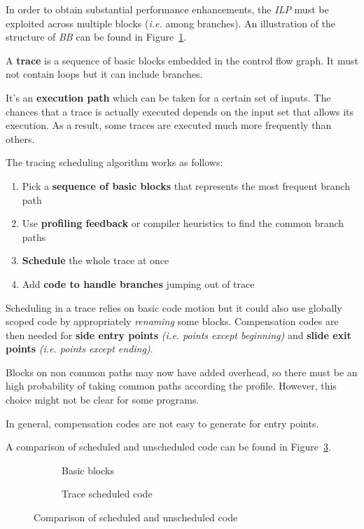 \documentclass[english]{article}
\begin{document}
In order to obtain substantial performance enhancements, the \textit{ILP} must be exploited across multiple blocks (\textit{i.e.} among branches).
An illustration of the structure of \textit{BB} can be found in Figure~\ref{fig:basic-blocks}.

\bigskip
A \textbf{trace} is a sequence of basic blocks embedded in the control flow graph.
It must not contain loops but it can include branches.

It's an \textbf{execution path} which can be taken for a certain set of inputs.
The chances that a trace is actually executed depends on the input set that allows its execution.
As a result, some traces are executed much more frequently than others.

The tracing scheduling algorithm works as follows:

\begin{enumerate}
  \item Pick a \textbf{sequence of basic blocks} that represents the most frequent branch path
  \item Use \textbf{profiling feedback} or compiler heuristics to find the common branch paths
  \item \textbf{Schedule} the whole trace at once
  \item Add \textbf{code to handle branches} jumping out of trace
\end{enumerate}

Scheduling in a trace relies on basic code motion but it could also use globally scoped code by appropriately \textit{renaming} some blocks.
Compensation codes are then needed for \textbf{side entry points} \textit{(i.e. points except beginning)} and \textbf{slide exit points} \textit{(i.e. points except ending)}.

Blocks on non common paths may now have added overhead, so there must be an high probability of taking common paths according the profile.
However, this choice might not be clear for some programs.

In general, compensation codes are not easy to generate for entry points.

\bigskip
A comparison of scheduled and unscheduled code can be found in Figure~\ref{fig:compare-scheduled-unscheduled-code}.

\begin{figure}[htbp]
  \bigskip
  \centering

  \begin{subfigure}[b]{0.495\textwidth}
    \centering
    \caption{Basic blocks}
    \label{fig:basic-blocks}
  \end{subfigure}
  \begin{subfigure}[b]{0.495\textwidth}
    \centering
    \caption{Trace scheduled code}
    \label{fig:trace-scheduled-code}
  \end{subfigure}
  \caption{Comparison of scheduled and unscheduled code}
  \label{fig:compare-scheduled-unscheduled-code}
  \bigskip
\end{figure}
\end{document}
